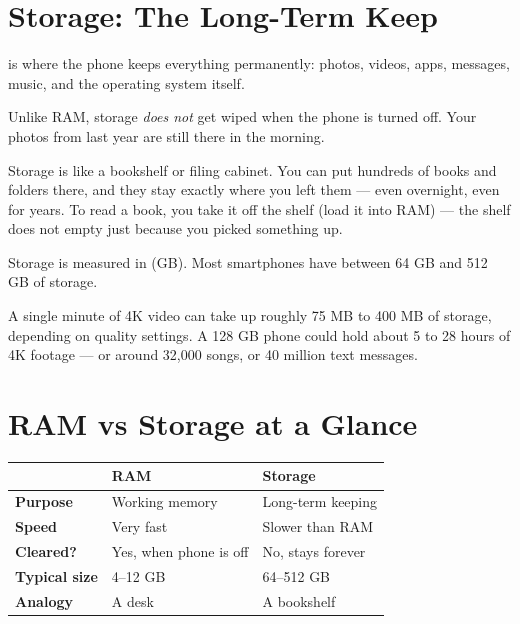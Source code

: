 \sectionrule

\section*{Storage: The Long-Term Keep}

 is where the phone keeps everything permanently:
photos, videos, apps, messages, music, and the operating system itself.

Unlike RAM, storage \emph{does not} get wiped when the phone is turned off.
Your photos from last year are still there in the morning.

\begin{picturethis}
  Storage is like a bookshelf or filing cabinet.
  You can put hundreds of books and folders there, and they stay
  exactly where you left them — even overnight, even for years.
  To read a book, you take it off the shelf (load it into RAM) —
  the shelf does not empty just because you picked something up.
\end{picturethis}

Storage is measured in  (GB).
Most smartphones have between 64 GB and 512 GB of storage.

\begin{funfact}
  A single minute of 4K video can take up roughly 75 MB to 400 MB of storage,
  depending on quality settings.
  A 128 GB phone could hold about 5 to 28 hours of 4K footage — or around
  32,000 songs, or 40 million text messages.
\end{funfact}

\sectionrule

\section*{RAM vs Storage at a Glance}

\begin{quickmap}
  \begin{center}
  \begin{tabular}{lll}
    & \textbf{RAM} & \textbf{Storage} \\
    \hline
    \textbf{Purpose}  & Working memory & Long-term keeping \\
    \textbf{Speed}    & Very fast       & Slower than RAM \\
    \textbf{Cleared?} & Yes, when phone is off & No, stays forever \\
    \textbf{Typical size} & 4–12 GB      & 64–512 GB \\
    \textbf{Analogy}  & A desk         & A bookshelf \\
  \end{tabular}
  \end{center}
\end{quickmap}

